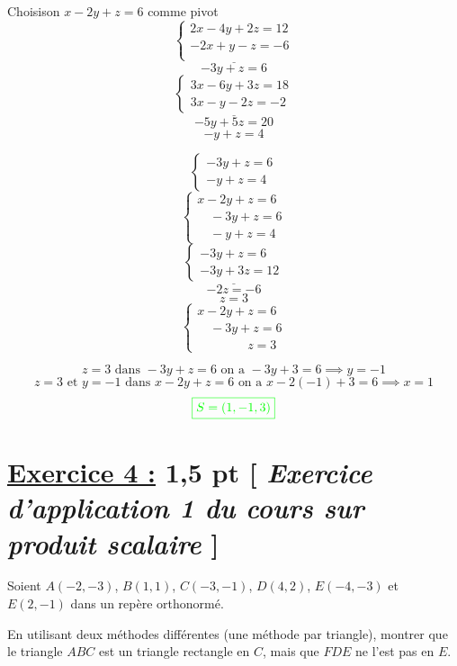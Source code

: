 \documentclass[12pt,a4paper]{article}
\begin{document}
\begin{enumerate}
Choisison $x - 2y + z = 6$ comme pivot 
    \[
\underline{    \begin{cases}
        2x - 4y + 2z = 12 \\
        -2x + y - z = -6 \\
    \end{cases}}
    \]
    \[-3y+z=6\]
    \[
\underline{    \begin{cases}
        3x - 6y + 3z = 18 \\
        3x - y - 2z = -2 
    \end{cases}}
    \]
    \[-5y+5z=20\]
    \[-y+z=4\]

    \[
\begin{cases}
        -3y+z=6 \\
        -y+z=4
    \end{cases}
    \]
        \[
    \begin{cases}
        x - 2y + z = 6 \\
        \quad -3y+z=6 \\
        \quad -y+z=4
    \end{cases}
    \]
    \[
\underline{    \begin{cases}
        -3y+z=6 \\
        -3y+3z=12
    \end{cases}}
    \]
    \[-2z=-6\]
    \[z=3\]
    \[
    \begin{cases}
        x - 2y + z = 6 \\
        \quad -3y+z=6 \\
        \quad\quad\quad\quad z=3
    \end{cases}
    \]
    
    \[z=3 \text{ dans } -3y+z=6  \text{ on a } -3y+3=6 \implies y=-1\]
    \[\text{$z=3 $ et $y=-1$ dans } x - 2y + z = 6  \text{ on a } x - 2(-1) + 3 = 6 \implies x=1\]
\[
\textcolor{green}{\boxed{S = (1,-1,3)   }} 
\]
\end{enumerate}

\section*{\underline{Exercice 4 :} 1,5 pt [\textit{ Exercice d'application 1 du cours sur produit scalaire} ]} 
Soient $A(-2, -3)$, $B(1, 1)$, $C(-3, -1)$, $D(4, 2)$, $E(-4, -3)$ et $E(2, -1)$ dans un repère orthonormé.

En utilisant deux méthodes différentes (une méthode par triangle), montrer que le triangle $ABC$ est un triangle rectangle en $C$, mais que $FDE$ ne l'est pas en $E$.
\end{document}
